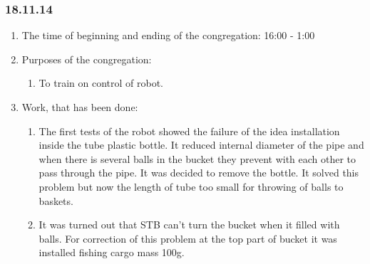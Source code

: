 \subsubsection{18.11.14}

\begin{enumerate}
	\item The time of beginning and ending of the congregation:
	16:00 - 1:00
	\item Purposes of the congregation:
	\begin{enumerate}
	  \item To train on control of robot.
	  
    \end{enumerate}
    
	\item Work, that has been done:
	\begin{enumerate}
	  \item The first tests of the robot showed the failure of the idea installation inside the tube plastic bottle. It reduced internal diameter of the pipe and when there is several balls in the bucket they prevent with each other to pass through the pipe. It was decided to remove the bottle. It solved this problem but now the length of tube too small for throwing of balls to baskets.
      
      \item It was turned out that STB can't turn the bucket when it filled with balls. For correction of this problem at the top part of bucket it was installed fishing cargo mass 100g.
      

\end{enumerate}
\end{enumerate}
